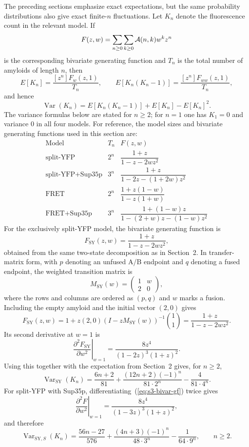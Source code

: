 \documentclass[referee,lineno,pdflatex,sn-mathphys-ay]{sn-jnl}
\newcommand{\cA}{ {\cal A} }
\begin{document}
The preceding sections emphasize exact expectations, but the same probability distributions also give exact finite-$n$ fluctuations. Let $K_n$ denote the fluorescence count in the relevant model. If
\[
F(z,w) = \sum_{n \ge 0} \sum_{k \ge 0} \cA(n,k) w^k z^n
\]
is the corresponding bivariate generating function and $T_n$ is the total number of amyloids of length $n$, then
\[
E[K_n] = \frac{[z^n]F_w(z,1)}{T_n}, \qquad
E[K_n(K_n-1)] = \frac{[z^n]F_{ww}(z,1)}{T_n},
\]
and hence
\[
\operatorname{Var}(K_n) = E[K_n(K_n-1)] + E[K_n] - E[K_n]^2.
\]
The variance formulas below are stated for $n \ge 2$; for $n=1$ one has $K_1=0$ and variance $0$ in all four models. For reference, the model sizes and bivariate generating functions used in this section are:
\[
\begin{array}{c|c|c}
\text{Model} & T_n & F(z,w) \\
\hline
\text{split-YFP} & 2^n & \dfrac{1+z}{1-z-2wz^2} \\[8pt]
\text{split-YFP+Sup35p} & 3^n & \dfrac{1+z}{1-2z-(1+2w)z^2} \\[8pt]
\text{FRET} & 2^n & \dfrac{1+z(1-w)}{1-z(1+w)} \\[8pt]
\text{FRET+Sup35p} & 3^n & \dfrac{1+(1-w)z}{1-(2+w)z-(1-w)z^2}
\end{array}
\]
For the exclusively split-YFP model, the bivariate generating function is
\[
F_{\text{SY}}(z,w) = \frac{1+z}{1-z-2wz^2},
\]
obtained from the same two-state decomposition as in Section~2. In transfer-matrix form, with $p$ denoting an unfused A/B endpoint and $q$ denoting a fused endpoint, the weighted transition matrix is
\[
M_{\text{SY}}(w)=
\begin{pmatrix}
1 & w\\
2 & 0
\end{pmatrix},
\]
where the rows and columns are ordered as $(p,q)$ and $w$ marks a fusion. Including the empty amyloid and the initial vector $(2,0)$ gives
\[
F_{\text{SY}}(z,w)=1+z(2,0)\left(I-zM_{\text{SY}}(w)\right)^{-1}\binom{1}{1}
=\frac{1+z}{1-z-2wz^2}.
\]
Its second derivative at $w=1$ is
\[
\left. \frac{\partial^2 F_{\text{SY}}}{\partial w^2} \right|_{w=1}
= \frac{8z^4}{(1-2z)^3(1+z)^2}.
\]
Using this together with the expectation from Section~2 gives, for $n \ge 2$,
\[
\operatorname{Var}_{\text{SY}}(K_n)
=
\frac{6n+2}{81}
+
\frac{(12n+2)(-1)^n}{81\cdot 2^n}
-
\frac{4}{81\cdot 4^n}.
\]
For split-YFP with Sup35p, differentiating~(\ref{eq:s3-bivar-gf}) twice gives
\[
\left. \frac{\partial^2 F}{\partial w^2} \right|_{w=1}
= \frac{8z^4}{(1-3z)^3(1+z)^2},
\]
and therefore
\[
\operatorname{Var}_{\text{SY},S}(K_n)
=
\frac{56n-27}{576}
+
\frac{(4n+3)(-1)^n}{48\cdot 3^n}
-
\frac{1}{64\cdot 9^n},
\qquad n \ge 2.
\]
\end{document}
